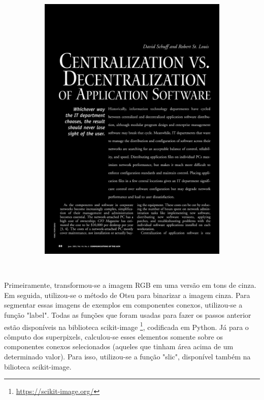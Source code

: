\documentclass{article}
\begin{document}
\begin{figure}[H]
\begin{subfigure}[b]{150px}
				\includegraphics[width=\textwidth]{10.png}
			\end{subfigure}	\\	
		\end{figure}
		
		Primeiramente, transformou-se a imagem RGB em uma versão em tons de cinza. Em seguida, utilizou-se o método de Otsu para binarizar a imagem cinza. Para segmentar essas imagens de exemplos em componentes conexos, utilizou-se a função "label". Todas as funções que foram usadas para fazer os passos anterior estão disponíveis na biblioteca scikit-image \footnote{\url{https://scikit-image.org/}}, codificada em Python. Já para o cômputo dos superpixels, calculou-se esses elementos somente sobre os componentes conexos selecionados (aqueles que tinham área acima de um determinado valor). Para isso, utilizou-se a função "slic", disponível também na bilioteca scikit-image. 
		
\end{document}
